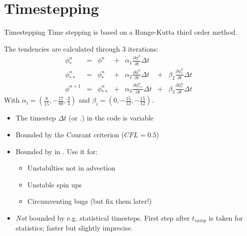 \section[Time]{Timestepping}
\begin{frame}[allowframebreaks]{Timestepping}
Time stepping is based on a Runge-Kutta third order method. 

The tendencies are calculated through 3 iterations:
\begin{align*}
	\phi_*^{n} &=& \phi^{n} &+& \alpha_1 \frac{\partial \phi^{n}}{\partial t} \Delta t& \\
	\phi_{**}^{n} &=& \phi_*^{n} &+& \alpha_2 \frac{\partial \phi^{n}}{\partial t} \Delta t &+& \beta_2 \frac{\partial \phi_*^{n}}{\partial t} \Delta t \\
 	\phi^{n+1} &=& \phi_{**}^{n} &+& \alpha_3 \frac{\partial \phi_{**}^{n}}{\partial t} \Delta t &+& \beta_3 \frac{\partial \phi_*^{n}}{\partial t} \Delta t
\end{align*}
With $\alpha_i = (\frac{8}{15}, -\frac{17}{60}, \frac{3}{4})$
and $\beta_i = (0, -\frac{15}{12}, -\frac{15}{12})$.	
\pagebreak
\begin{itemize}
 \item The timestep $\Delta t$ (or .) in the code is variable
\item Bounded by the Courant criterion ($CFL = 0.5$)
\item Bounded by  in . Use it for: 
\begin{itemize}
 \item Unstabilties not in advection
 \item Unstable spin ups
 \item Circumventing bugs (but fix them later!)
\end{itemize}

\item \emph{Not} bounded by e.g. statistical timesteps. First step after $t_{samp}$ is taken for statistics; faster but slightly imprecise.
\end{itemize}
 
\end{frame}
